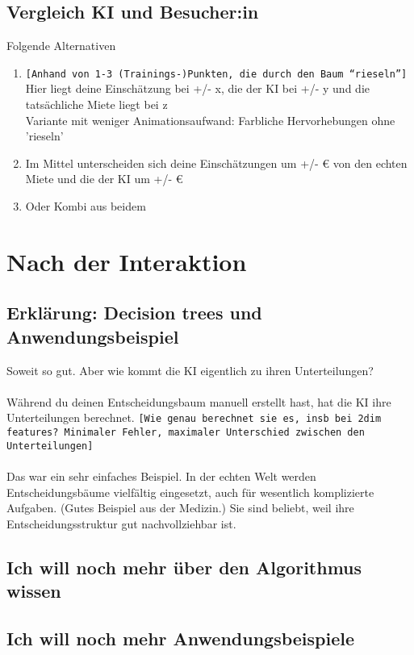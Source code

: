\documentclass[12pt]{article}
\begin{document}
\subsection{Vergleich KI und Besucher:in}
Folgende Alternativen
\begin{enumerate}
    \item \texttt{[Anhand von 1-3 (Trainings-)Punkten, die durch den Baum ``rieseln'']} Hier liegt deine Einschätzung bei +/- x, die der KI bei +/- y und die tatsächliche Miete liegt bei z\\
    Variante mit weniger Animationsaufwand: Farbliche Hervorhebungen ohne 'rieseln'
    \item Im Mittel unterscheiden sich deine Einschätzungen um +/- \euro{} von den echten Miete und die der KI um +/- \euro{}
    \item Oder Kombi aus beidem
\end{enumerate}

\section{Nach der Interaktion}
\subsection{Erklärung: Decision trees und Anwendungsbeispiel}
Soweit so gut. Aber wie kommt die KI eigentlich zu ihren Unterteilungen?\\
\\
Während du deinen Entscheidungsbaum manuell erstellt hast, hat die KI ihre Unterteilungen berechnet. \texttt{[Wie genau berechnet sie es, insb bei 2dim features? Minimaler Fehler, maximaler Unterschied zwischen den Unterteilungen]}\\
\\
Das war ein sehr einfaches Beispiel. In der echten Welt werden Entscheidungsbäume vielfältig eingesetzt, auch für wesentlich komplizierte Aufgaben. (Gutes Beispiel aus der Medizin.) Sie sind beliebt, weil ihre Entscheidungsstruktur gut nachvollziehbar ist.

\subsection{Ich will noch mehr über den Algorithmus wissen}

\subsection{Ich will noch mehr Anwendungsbeispiele}
\end{document}
